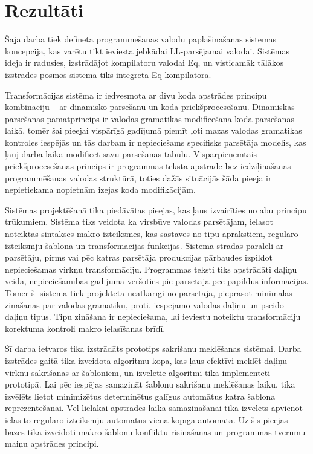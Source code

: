 \section*{Rezultāti}
\label{s:results}

Šajā darbā tiek definēta programmēšanas valodu paplašināšanas sistēmas koncepcija, kas varētu tikt ieviesta jebkādai LL-parsējamai valodai. Sistēmas ideja ir radusies, izstrādājot kompilatoru valodai Eq, un visticamāk tālākos izstrādes posmos sistēma tiks integrēta Eq kompilatorā.

Transformācijas sistēma ir iedvesmota ar divu koda apstrādes principu kombināciju -- ar dinamisko parsēšanu un koda priekšprocesēšanu. Dinamiskas parsēšanas pamatprincips ir valodas gramatikas modificēšana koda parsēšanas laikā, tomēr šai pieejai vispārīgā gadījumā piemīt ļoti mazas valodas gramatikas kontroles iespējās un tās darbam ir nepieciešams specifisks parsētāja modelis, kas ļauj darba laikā modificēt savu parsēšanas tabulu. Vispārpieņemtais priekšprocesēšanas princips ir programmas teksta apstrāde bez iedziļināšanās programmēšanas valodas struktūrā, toties dažās situācijās šāda pieeja ir nepietiekama nopietnām izejas koda modifikācijām.

Sistēmas projektēšanā tika piedāvātas pieejas, kas ļaus izvairīties no abu principu trūkumiem. Sistēma tiks veidota ka virsbūve valodas parsētājam, ielasot noteiktas sintakses makro izteiksmes, kas sastāvēs no tipu aprakstiem, regulāro izteiksmju šablona un transformācijas funkcijas. Sistēma strādās paralēli ar parsētāju, pirms vai pēc katras parsētāja produkcijas pārbaudes izpildot nepieciešamas virkņu transformāciju. Programmas teksti tiks apstrādāti daļiņu veidā, nepieciešamības gadījumā vēršoties pie parsētāja pēc papildus informācijas. Tomēr šī sistēma tiek projektēta neatkarīgi no parsētāja, pieprasot minimālas zināšanas par valodas gramatiku, proti, iespējamo valodas daļiņu un pseido-daļiņu tipus. Tipu zināšana ir nepieciešama, lai ieviestu noteiktu transformāciju korektuma kontroli makro ielasīšanas brīdī.

Šī darba ietvaros tika izstrādāts prototips sakrišanu meklēšanas sistēmai. Darba izstrādes gaitā tika izveidota algoritmu kopa, kas ļaus efektīvi meklēt daļiņu virkņu sakrišanas ar šabloniem, un izvēlētie algoritmi tika implementēti prototipā. Lai pēc iespējas samazināt šablonu sakrišanu meklēšanas laiku, tika izvēlēts lietot minimizētus determinētus galīgus automātus katra šablona reprezentēšanai. Vēl lielākai apstrādes laika samazināšanai tika izvēlēts apvienot ielasīto regulāro izteiksmju automātus vienā kopīgā automātā. Uz šīs pieejas bāzes tika izveidoti makro šablonu konfliktu risināšanas un programmas tvērumu maiņu apstrādes principi.

